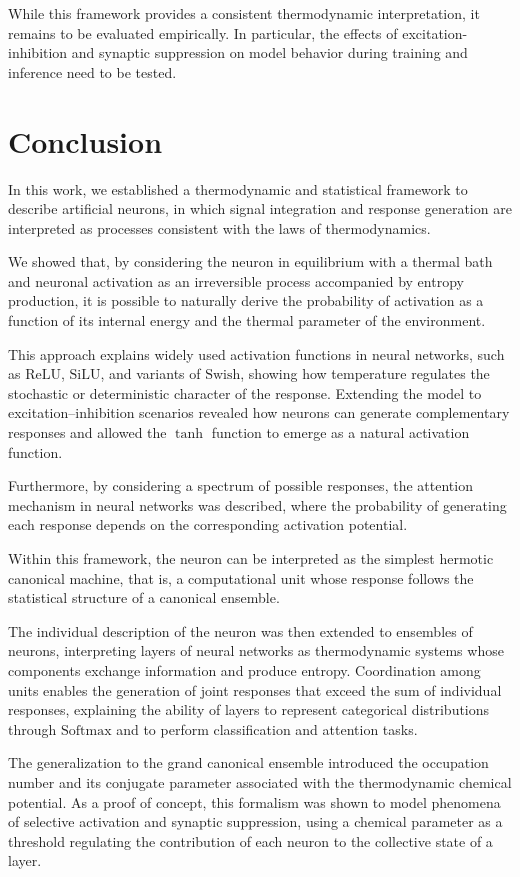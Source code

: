 \documentclass[12pt]{article}
\begin{document}
While this framework provides a consistent thermodynamic interpretation, it remains to be evaluated empirically. In particular, the effects of excitation-inhibition and synaptic suppression on model behavior during training and inference need to be tested.
\section*{Conclusion}

In this work, we established a thermodynamic and statistical framework to describe artificial neurons, in which signal integration and response generation are interpreted as processes consistent with the laws of thermodynamics.

We showed that, by considering the neuron in equilibrium with a thermal bath and neuronal activation as an irreversible process accompanied by entropy production, it is possible to naturally derive the probability of activation as a function of its internal energy and the thermal parameter of the environment.

This approach explains widely used activation functions in neural networks, such as $\text{ReLU}$, $\text{SiLU}$, and variants of $\text{Swish}$, showing how temperature regulates the stochastic or deterministic character of the response. Extending the model to excitation–inhibition scenarios revealed how neurons can generate complementary responses and allowed the $\tanh$ function to emerge as a natural activation function. 

Furthermore, by considering a spectrum of possible responses, the attention mechanism in neural networks was described, where the probability of generating each response depends on the corresponding activation potential.

Within this framework, the neuron can be interpreted as the simplest hermotic canonical machine, that is, a computational unit whose response follows the statistical structure of a canonical ensemble.

The individual description of the neuron was then extended to ensembles of neurons, interpreting layers of neural networks as thermodynamic systems whose components exchange information and produce entropy. Coordination among units enables the generation of joint responses that exceed the sum of individual responses, explaining the ability of layers to represent categorical distributions through $\text{Softmax}$ and to perform classification and attention tasks.

The generalization to the grand canonical ensemble introduced the occupation number and its conjugate parameter associated with the thermodynamic chemical potential. As a proof of concept, this formalism was shown to model phenomena of selective activation and synaptic suppression, using a chemical parameter as a threshold regulating the contribution of each neuron to the collective state of a layer.
\end{document}
